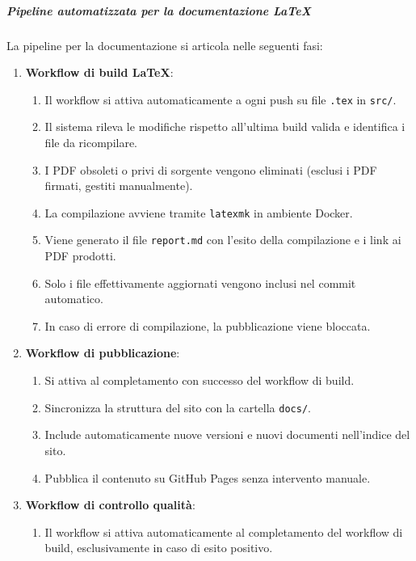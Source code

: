 \documentclass[a4paper, 11pt, oneside]{scrartcl}
\begin{document}
\subparagraph{Pipeline automatizzata per la documentazione \LaTeX{}}

La pipeline per la documentazione si articola nelle seguenti fasi:

\begin{enumerate}
    \item \textbf{Workflow di build \LaTeX{}}:
          \begin{enumerate}[label=\alph*.]
              \item Il workflow si attiva automaticamente a ogni push su file \texttt{.tex} in \texttt{src/}.
              \item Il sistema rileva le modifiche rispetto all'ultima build valida e identifica i file da ricompilare.
              \item I PDF obsoleti o privi di sorgente vengono eliminati (esclusi i PDF firmati, gestiti manualmente).
              \item La compilazione avviene tramite \texttt{latexmk} in ambiente Docker{\scriptsize{}}.
              \item Viene generato il file \texttt{report.md} con l'esito della compilazione e i link ai PDF prodotti.
              \item Solo i file effettivamente aggiornati vengono inclusi nel commit automatico.
              \item In caso di errore di compilazione, la pubblicazione viene bloccata.
          \end{enumerate}
    \item \textbf{Workflow di pubblicazione}:
          \begin{enumerate}[label=\alph*.]
              \item Si attiva al completamento con successo del workflow di build.
              \item Sincronizza la struttura del sito con la cartella \texttt{docs/}.
              \item Include automaticamente nuove versioni e nuovi documenti nell'indice del sito.
              \item Pubblica il contenuto su GitHub Pages senza intervento manuale.
          \end{enumerate}
    \item \textbf{Workflow di controllo qualità}:
          \begin{enumerate}[label=\alph*.]
              \item Il workflow si attiva automaticamente al completamento del workflow di build, esclusivamente in caso di esito positivo.

\end{enumerate}
\end{enumerate}
\end{document}
